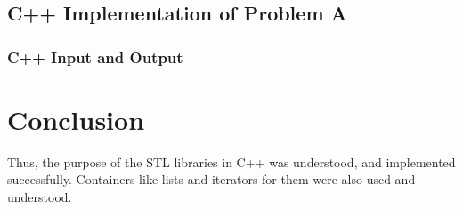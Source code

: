 \documentclass[11pt]{article}
\begin{document}
\subsection{C++ Implementation of Problem A}



\subsubsection{C++ Input and Output}


\section{Conclusion}
Thus, the purpose of the STL libraries in C++ was understood, and implemented successfully. Containers like lists and iterators for them were also used and understood.

\pagebreak
\end{document}
